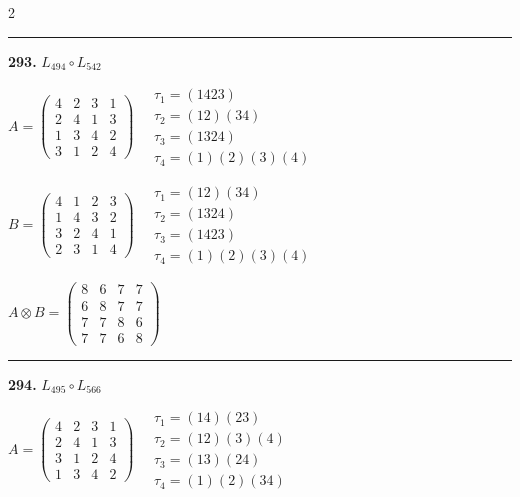 \begin{multicols}{2}
\vspace{0.3em}
\hrule
\vspace{0.3em}

\noindent\textbf{293.} $L_{494} \circ L_{542}$

$A = \begin{pmatrix} 4 & 2 & 3 & 1 \\ 2 & 4 & 1 & 3 \\ 1 & 3 & 4 & 2 \\ 3 & 1 & 2 & 4 \end{pmatrix} \quad \begin{matrix} \tau_{1}=(1 4 2 3) \\ \tau_{2}=(1 2)(3 4) \\ \tau_{3}=(1 3 2 4) \\ \tau_{4}=(1)(2)(3)(4) \end{matrix}$

$B = \begin{pmatrix} 4 & 1 & 2 & 3 \\ 1 & 4 & 3 & 2 \\ 3 & 2 & 4 & 1 \\ 2 & 3 & 1 & 4 \end{pmatrix} \quad \begin{matrix} \tau_{1}=(1 2)(3 4) \\ \tau_{2}=(1 3 2 4) \\ \tau_{3}=(1 4 2 3) \\ \tau_{4}=(1)(2)(3)(4) \end{matrix}$

$A \otimes B = \begin{pmatrix} 8 & 6 & 7 & 7 \\ 6 & 8 & 7 & 7 \\ 7 & 7 & 8 & 6 \\ 7 & 7 & 6 & 8 \end{pmatrix}$

\vspace{0.3em}
\hrule
\vspace{0.3em}

\noindent\textbf{294.} $L_{495} \circ L_{566}$

$A = \begin{pmatrix} 4 & 2 & 3 & 1 \\ 2 & 4 & 1 & 3 \\ 3 & 1 & 2 & 4 \\ 1 & 3 & 4 & 2 \end{pmatrix} \quad \begin{matrix} \tau_{1}=(1 4)(2 3) \\ \tau_{2}=(1 2)(3)(4) \\ \tau_{3}=(1 3)(2 4) \\ \tau_{4}=(1)(2)(3 4) \end{matrix}$


\end{multicols}
